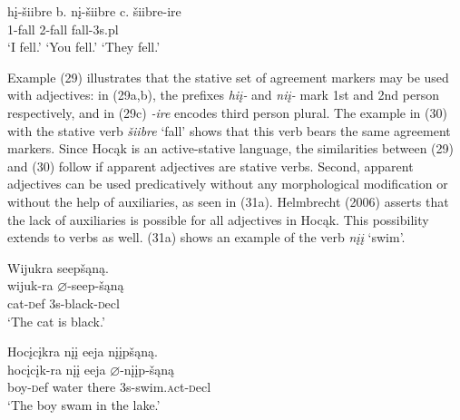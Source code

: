 \documentclass[output=paper]{LSP/langsci}
\begin{document}
\begin{exe}
\ex
\begin{xlist}
\ex \gll
h\k{i}-\v{s}iibre \hspace{30pt}  b. {} n\k{i}-\v{s}iibre \hspace{43pt} c. {} \v{s}iibre-ire\\
1-fall {} {} {} 2-fall {} {} {} fall-{\textsc 3s.pl}\\
\glt `I fell.' \hspace{2cm} `You fell.'  \hspace{1.7cm} `They fell.'


\end{xlist}
\end{exe}

Example (29) illustrates that the stative set of agreement markers may be used with adjectives: in (29a,b), the prefixes \textit{hi\k{i}-} and \textit{ni\k{i}-} mark 1st and 2nd person respectively, and in (29c) \textit{-ire} encodes third person plural. The example in (30) with the stative verb \textit{\v{s}iibre} `fall' shows that this verb bears the same agreement markers. Since Hoc\k{a}k is an active-stative language, the similarities between (29) and (30) follow if apparent adjectives are stative verbs. Second, apparent adjectives can be used predicatively without any morphological modification or without the help of auxiliaries, as seen in (31a). Helmbrecht (2006) asserts that the lack of auxiliaries is possible for all adjectives in Hoc\k{a}k. This possibility extends to verbs as well. (31a) shows an example of the verb \textit{n\k{i}\k{i}} `swim'.

\begin{exe}
\ex
\begin{xlist}

\ex \glll Wijukra seep\v{s}\k{a}n\k{a}. \\
wijuk-ra $\varnothing$-seep-\v{s}\k{a}n\k{a}\\
cat-{\textsc def} {\textsc 3s}-black-{\textsc decl}\\
\glt `The cat is black.'


\ex \glll Hoc\k{i}c\k{i}kra n\k{i}\k{i} eeja n\k{i}\k{i}p\v{s}\k{a}n\k{a}.\\
hoc\k{i}c\k{i}k-ra n\k{i}\k{i} eeja $\varnothing$-n\k{i}\k{i}p-\v{s}\k{a}n\k{a}\\
boy-{\textsc def} water there {\textsc 3s}-swim.{\textsc act}-{\textsc decl}\\
\glt `The boy swam in the lake.'

\end{xlist}
\end{exe}
\end{document}
